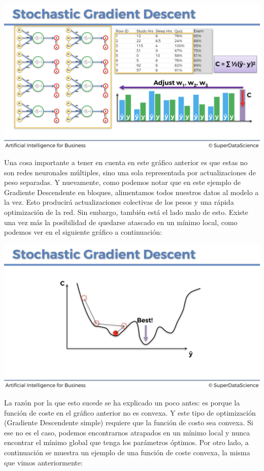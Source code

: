 \documentclass[]{book}
\begin{document}
\includegraphics{Images/ANN_26.png}

Una cosa importante a tener en cuenta en este gráfico anterior es que estas no son redes neuronales múltiples, sino una sola representada por actualizaciones de peso separadas. Y nuevamente, como podemos notar que en este ejemplo de Gradiente Descendente en bloques, alimentamos todos nuestros datos al modelo a la vez. Esto producirá actualizaciones colectivas de los pesos y una rápida optimización de la red. Sin embargo, también está el lado malo de esto. Existe una vez más la posibilidad de quedarse atascado en un mínimo local, como podemos ver en el siguiente gráfico a continuación:

\includegraphics{Images/ANN_30.png}

La razón por la que esto sucede se ha explicado un poco antes: es porque la función de coste en el gráfico anterior no es convexa. Y este tipo de optimización (Gradiente Descendente simple) requiere que la función de costo sea convexa. Si ese no es el caso, podemos encontrarnos atrapados en un mínimo local y nunca encontrar el mínimo global que tenga los parámetros óptimos. Por otro lado, a continuación se muestra un ejemplo de una función de coste convexa, la misma que vimos anteriormente:
\end{document}
